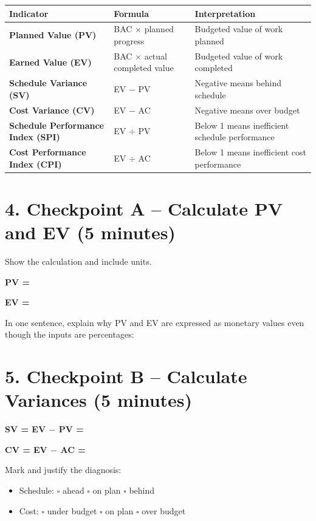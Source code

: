\documentclass[11pt,a4paper]{article}
\begin{document}
\begin{center}
\begin{tabularx}{\textwidth}{>{\bfseries}p{3cm} p{4.5cm} Y}
\toprule
Indicator & Formula & Interpretation \\
\midrule
Planned Value (PV) & BAC $\times$ planned progress & Budgeted value of work planned \\
Earned Value (EV) & BAC $\times$ actual completed value & Budgeted value of work completed \\
Schedule Variance (SV) & EV $-$ PV & Negative means behind schedule \\
Cost Variance (CV) & EV $-$ AC & Negative means over budget \\
Schedule Performance Index (SPI) & EV $\div$ PV & Below 1 means inefficient schedule performance \\
Cost Performance Index (CPI) & EV $\div$ AC & Below 1 means inefficient cost performance \\
\bottomrule
\end{tabularx}
\end{center}

\section{4. Checkpoint A -- Calculate PV and EV (5 minutes)}

Show the calculation and include units.

\textbf{PV =} \blankline

\vspace{6mm}
\textbf{EV =} \blankline

\vspace{6mm}
In one sentence, explain why PV and EV are expressed as monetary values even though the inputs are percentages:

\vspace{8mm}\blankline

\section{5. Checkpoint B -- Calculate Variances (5 minutes)}

\textbf{SV = EV $-$ PV =} \blankline

\vspace{6mm}
\textbf{CV = EV $-$ AC =} \blankline

\vspace{6mm}
Mark and justify the diagnosis:

\begin{itemize}
  \item Schedule: $\square$ ahead \quad $\square$ on plan \quad $\square$ behind
  \item Cost: $\square$ under budget \quad $\square$ on plan \quad $\square$ over budget
\end{itemize}
\end{document}
